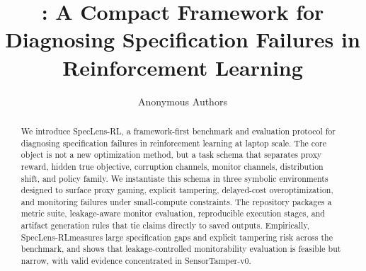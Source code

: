 \documentclass[10pt,twocolumn,letterpaper]{article}
\title{\framework: A Compact Framework for Diagnosing Specification Failures in Reinforcement Learning}
\author{
Anonymous Authors
}
\newcommand{\framework}{SpecLens-RL}
\begin{document}
\maketitle

\begin{abstract}
We introduce \framework, a framework-first benchmark and evaluation protocol
for diagnosing specification failures in reinforcement learning at laptop
scale. The core object is not a new optimization method, but a task schema that
separates proxy reward, hidden true objective, corruption channels, monitor
channels, distribution shift, and policy family. We instantiate this schema in
three symbolic environments designed to surface proxy gaming, explicit
tampering, delayed-cost overoptimization, and monitoring failures under
small-compute constraints. The repository packages a metric suite,
leakage-aware monitor evaluation, reproducible execution stages, and artifact
generation rules that tie claims directly to saved outputs. Empirically,
\framework measures large specification gaps and explicit tampering risk across
the benchmark, and shows that leakage-controlled monitorability evaluation is
feasible but narrow, with valid evidence concentrated in SensorTamper-v0.
\end{abstract}













\end{document}
